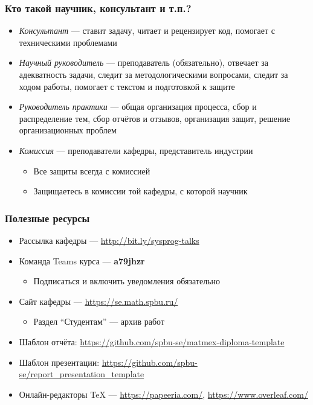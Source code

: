 \documentclass[xetex,mathserif,serif]{beamer}
\begin{document}
    \begin{frame}
        \frametitle{Кто такой научник, консультант и т.п.?}
        \begin{itemize}
            \item \textit{Консультант} --- ставит задачу, читает и рецензирует код, помогает с техническими проблемами
            \item \textit{Научный руководитель} --- преподаватель (обязательно), отвечает за адекватность задачи, следит за методологическими вопросами, следит за ходом работы, помогает с текстом и подготовкой к защите
            \item \textit{Руководитель практики} --- общая организация процесса, сбор и распределение тем, сбор отчётов и отзывов, организация защит, решение организационных проблем
            \item \textit{Комиссия} --- преподаватели кафедры, представитель индустрии
            \begin{itemize}
                \item Все защиты всегда с комиссией
                \item Защищаетесь в комиссии той кафедры, с которой научник
            \end{itemize}
        \end{itemize}
    \end{frame}

    \begin{frame}
        \frametitle{Полезные ресурсы}
        \begin{itemize}
            \item Рассылка кафедры --- \url{http://bit.ly/sysprog-talks}
            \item Команда Teams курса --- \textbf{a79jhzr}
            \begin{itemize}
                \item Подписаться и включить уведомления обязательно
            \end{itemize}
            \item Сайт кафедры --- \url{https://se.math.spbu.ru/}
            \begin{itemize}
                \item Раздел ``Студентам'' --- архив работ
            \end{itemize}
            \item Шаблон отчёта: \url{https://github.com/spbu-se/matmex-diploma-template}
            \item Шаблон презентации: \url{https://github.com/spbu-se/report_presentation_template}
            \item Онлайн-редакторы TeX --- \url{https://papeeria.com/}, \url{https://www.overleaf.com/}
        \end{itemize}
    \end{frame}
\end{document}
